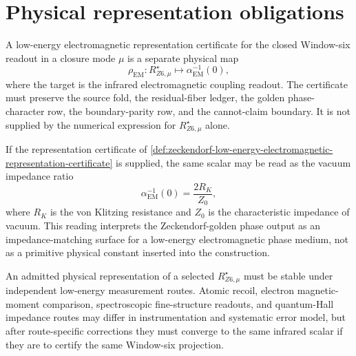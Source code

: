 \section{Physical representation obligations}

\begin{definition}
\label{def:zeckendorf-low-energy-electromagnetic-representation-certificate}
A low-energy electromagnetic representation certificate for the closed
Window-six readout in a closure mode \(\mu\) is a separate physical map
$$
  \rho_{\mathrm{EM}}
  :
  R_{Z6,\mu}^\star
  \longmapsto
  \alpha_{\mathrm{EM}}^{-1}(0),
$$
where the target is the infrared electromagnetic coupling readout. The
certificate must preserve the source fold, the residual-fiber ledger, the
golden phase-character row, the boundary-parity row, and the
cannot-claim boundary. It is not supplied by the numerical expression for
\(R_{Z6,\mu}^\star\) alone.
\end{definition}

\begin{principle}
\label{prin:zeckendorf-impedance-reading}
If the representation certificate of
\autoref{def:zeckendorf-low-energy-electromagnetic-representation-certificate}
is supplied, the same scalar may be read as the vacuum impedance ratio
$$
  \alpha_{\mathrm{EM}}^{-1}(0)
  =
  \frac{2R_K}{Z_0},
$$
where \(R_K\) is the von Klitzing resistance and \(Z_0\) is the
characteristic impedance of vacuum. This reading interprets the
Zeckendorf-golden phase output as an impedance-matching surface for a
low-energy electromagnetic phase medium, not as a primitive physical
constant inserted into the construction.
\end{principle}

\begin{principle}
\label{prin:zeckendorf-independent-route-convergence}
An admitted physical representation of a selected \(R_{Z6,\mu}^\star\)
must be stable under independent low-energy measurement routes. Atomic recoil,
electron magnetic-moment comparison, spectroscopic fine-structure
readouts, and quantum-Hall impedance routes may differ in instrumentation
and systematic error model, but after route-specific corrections they
must converge to the same infrared scalar if they are to certify the same
Window-six projection.
\end{principle}

